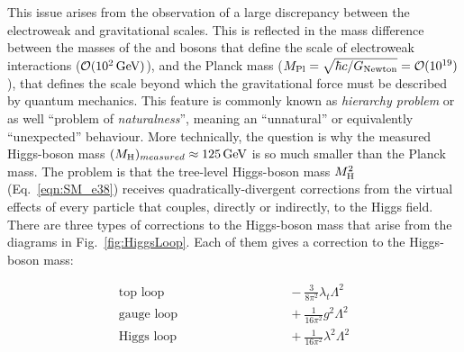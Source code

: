 This issue arises from the observation of a large discrepancy between the electroweak and gravitational scales. This is reflected in the mass difference between the masses of the \PW and \PZ bosons that define the scale of electroweak interactions ($\mathcal{O}(10^2\,\text{Ge\hspace{-.08em}V})$), and the Planck mass ($M_\mathrm{Pl} = \sqrt{\hbar c/G_\mathrm{Newton}} = \mathcal{O}(10^{19})$), that defines the scale beyond which the gravitational force must be described by quantum mechanics. This feature is commonly known as \textit{hierarchy problem} or as well ``problem of \textit{naturalness}'', meaning an ``unnatural'' or equivalently ``unexpected'' behaviour.
More technically, the question is why the measured Higgs-boson mass $(M_\mathrm{H})_{measured} \approx 125\,\text{Ge\hspace{-.08em}V}$ is so much smaller than the Planck mass.
The problem is that the tree-level Higgs-boson mass $M^2_\mathrm{H}$ (Eq.~\ref{eqn:SM_e38}) receives quadratically-divergent corrections from the virtual effects of every particle that couples, directly or indirectly, to the Higgs field.
There are three types of corrections to the Higgs-boson mass that arise from the diagrams in Fig.~\ref{fig:HiggsLoop}.
Each of them gives a correction to the Higgs-boson mass:

\begin{equation}\label{eqn:HiggsCorr}
\begin{aligned}
\mbox{top loop} & \qquad\qquad\qquad\qquad -\frac{3}{8\pi^2}\lambda_t\Lambda^2\\
\mbox{gauge loop} & \qquad\qquad\qquad\qquad + \frac{1}{16\pi^2}g^2\Lambda^2\\
\mbox{Higgs loop} & \qquad\qquad\qquad\qquad + \frac{1}{16\pi^2}\lambda^2\Lambda^2\\
\end{aligned}
\end{equation}

